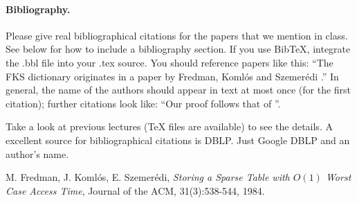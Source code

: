 \documentclass[11pt]{article}
\begin{document}
\paragraph{Bibliography.}
Please give real bibliographical citations for the papers that we
mention in class. See below for how to include a bibliography section.
If you use BibTeX, integrate the .bbl file into your .tex
source. You should reference papers like this: ``The FKS
dictionary originates in a paper by Fredman, Koml\'{o}s and
Szemer\'{e}di \cite{fks}.'' In general, the name of the authors should
appear in text at most once (for the first citation); further
citations look like: ``Our proof follows that of \cite{fks}''.

Take a look at previous lectures (TeX files are available) to see the
details. A excellent source for bibliographical citations is
DBLP. Just Google DBLP and an author's name.


%


\begin{thebibliography}{77}

M. Fredman, J. Koml\'{o}s, E. Szemer\'{e}di,
\emph{Storing a Sparse Table with $O(1)$ Worst Case Access Time},
Journal of the ACM, 31(3):538-544, 1984.

\end{thebibliography}
\end{document}
